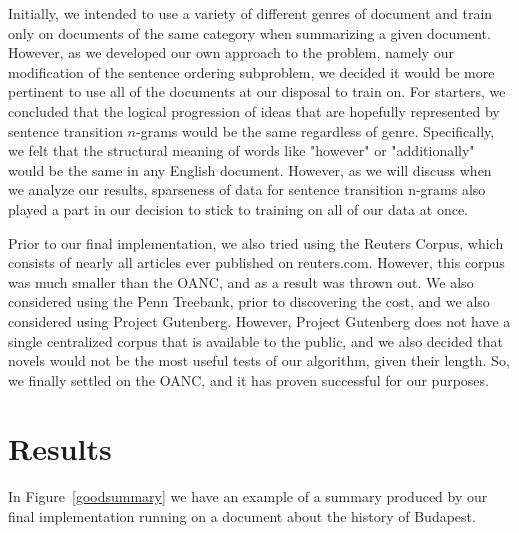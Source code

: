 \documentclass[12pt]{article}
\theoremstyle{plain}
\theoremstyle{definition}
\theoremstyle{remark}
\theoremstyle{plain}
\begin{document}
Initially, we intended to use a variety of different genres of document and train only on documents of the same category when summarizing a given document. However, as we developed our own approach to the problem, namely our modification of the sentence ordering subproblem, we decided it would be more pertinent to use all of the documents at our disposal to train on. For starters, we concluded that the logical progression of ideas that are hopefully represented by sentence transition $n$-grams would be the same regardless of genre. Specifically, we felt that the structural meaning of words like "however" or "additionally" would be the same in any English document. However, as we will discuss when we analyze our results, sparseness of data for sentence transition n-grams also played a part in our decision to stick to training on all of our data at once. 

	Prior to our final implementation, we also tried using the Reuters Corpus, which consists of nearly all articles ever published on reuters.com. However, this corpus was much smaller than the OANC, and as a result was thrown out. We also considered using the Penn Treebank, prior to discovering the cost, and we also considered using Project Gutenberg. However, Project Gutenberg does not have a single centralized corpus that is available to the public, and we also decided that novels would not be the most useful tests of our algorithm, given their length. So, we finally settled on the OANC, and it has proven successful for our purposes.
\section{Results}

	In Figure~\ref{goodsummary} we have an example of a summary produced by our final implementation running on a document about the history of Budapest.
\end{document}
